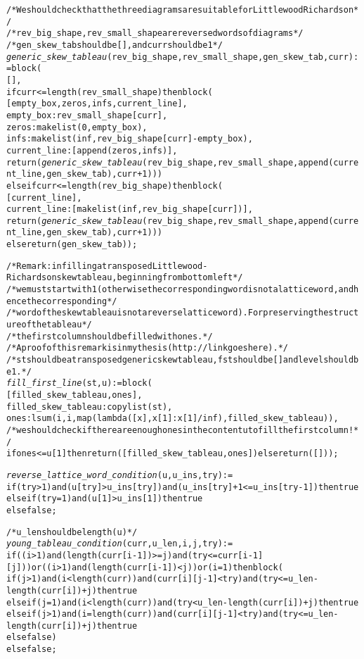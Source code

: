\begin{alltt}
/* We should check that the three diagrams are suitable for Littlewood Richardson */
/* rev_big_shape, rev_small_shape are reversed words of diagrams */
/* gen_skew_tab should be [], and curr should be 1 */
\emph{generic\_skew\_tableau} (rev\_big\_shape, rev\_small\_shape, gen\_skew\_tab, curr) := block (
  [],
  if curr <= length (rev\_small\_shape) then block (
    [empty\_box,zeros,infs,current\_line],
    empty\_box : rev\_small\_shape[curr],
    zeros : makelist (0, empty\_box),
    infs : makelist (inf, rev\_big\_shape[curr] - empty\_box),
    current\_line : [append (zeros, infs)],
    return (\emph{generic\_skew\_tableau} (rev\_big\_shape, rev\_small\_shape, append (current\_line, gen\_skew\_tab), curr + 1)))
  else if curr <= length (rev\_big\_shape) then block (
    [current\_line],
    current\_line : [makelist (inf, rev\_big\_shape[curr])],
    return (\emph{generic\_skew\_tableau} (rev\_big\_shape, rev\_small\_shape, append (current\_line, gen\_skew\_tab), curr + 1)))
  else return (gen\_skew\_tab));

/* Remark: in filling a transposed Littlewood-Richardson skew tableau, beginning from bottom left */
/* we must start with 1 (otherwise the corresponding word is not a lattice word, and hence the corresponding */
/* word of the skew tableau is not a reverse lattice word). For preserving the structure of the tableau */
/* the first column should be filled with ones. */
/* A proof of this remark is in my thesis (http://linkgoeshere). */
/* st should be a transposed generic skew tableau, fst should be [] and level should be 1. */
\emph{fill\_first\_line} (st, u) := block (
  [filled\_skew\_tableau, ones],
  filled\_skew\_tableau : copylist (st),
  ones : lsum (i, i, map (lambda ([x], x[1] : x[1]/inf), filled\_skew\_tableau)),
  /* we should check if there are enough ones in the content u to fill the first column! */
  if ones <= u[1] then return ([filled\_skew\_tableau, ones]) else return ([]));

\emph{reverse\_lattice\_word\_condition} (u, u\_ins, try) :=
if (try > 1) and (u[try] > u\_ins[try]) and (u\_ins[try] + 1 <= u\_ins [try-1]) then true
else if (try = 1) and (u[1] > u\_ins[1]) then true
else false;

/* u\_len should be length (u) */
\emph{young\_tableau\_condition} (curr, u\_len, i, j, try) :=
if ((i>1) and (length(curr[i-1])>=j) and (try<=curr[i-1][j])) or ((i>1) and (length(curr[i-1])<j)) or (i=1) then block (
  if (j>1) and (i<length(curr)) and (curr[i][j-1]<try) and (try<=u\_len-length(curr[i])+j) then true
  else if (j=1) and (i<length(curr)) and (try<u\_len-length(curr[i])+j) then true
  else if (j>1) and (i=length(curr)) and (curr[i][j-1]<try) and (try<=u\_len-length(curr[i])+j) then true
  else false)
else false;


\end{alltt}
